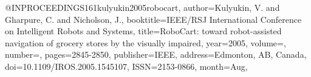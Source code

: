 @INPROCEEDINGS{161kulyukin2005robocart,
author={Kulyukin, V. and Gharpure, C. and Nicholson, J.},
booktitle={IEEE/RSJ International Conference on Intelligent Robots and Systems}, 
title={RoboCart: toward robot-assisted navigation of grocery stores by the visually impaired}, 
year={2005},
volume={},
number={},
pages={2845-2850},
publisher={IEEE},
address={Edmonton, AB, Canada},
doi={10.1109/IROS.2005.1545107},
ISSN={2153-0866},
month={Aug},}